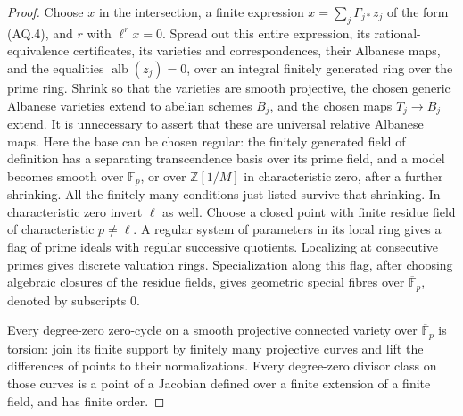 \begin{proof}
Choose $x$ in the intersection, a finite expression
$x=\sum_j\Gamma_{j*}z_j$ of the form (AQ.4), and $r$ with
$\ell^r x=0$. Spread out this entire expression, its
rational-equivalence certificates, its varieties and
correspondences, their Albanese maps, and the equalities
$\operatorname{alb}(z_j)=0$, over an integral finitely generated
ring over the prime ring. Shrink so that the varieties are
smooth projective, the chosen generic Albanese varieties extend
to abelian schemes $B_j$, and the chosen maps $T_j\to B_j$
extend. It is unnecessary to assert that these are universal
relative Albanese maps. Here the base can be chosen regular:
the finitely generated field of definition has a separating
transcendence basis over its prime field, and a model becomes
smooth over $\mathbb F_p$, or over $\mathbb Z[1/M]$ in
characteristic zero, after a further shrinking. All the
finitely many conditions just listed survive that shrinking.
In characteristic zero invert $\ell$ as well.
Choose a closed point with finite residue field of
characteristic $p\ne\ell$. A regular system of parameters
in its local ring gives a flag of prime ideals with regular
successive quotients. Localizing at consecutive primes
gives discrete valuation rings. Specialization along this
flag, after choosing algebraic closures of the residue
fields, gives geometric special fibres over
$\overline{\mathbb F}_p$, denoted by subscripts $0$.

Every degree-zero zero-cycle on a smooth projective connected
variety over $\overline{\mathbb F}_p$ is torsion: join its
finite support by finitely many projective curves and lift
the differences of points to their normalizations. Every
degree-zero divisor class on those curves is a point of a
Jacobian defined over a finite extension of a finite field,
and has finite order.


\end{proof}
